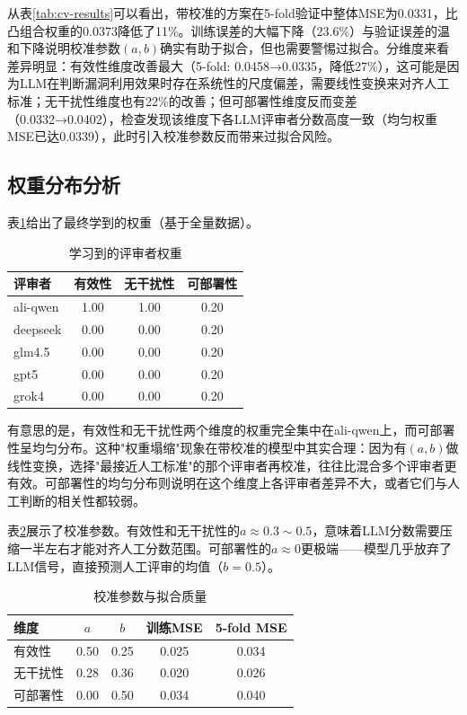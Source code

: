 从表\ref{tab:cv-results}可以看出，带校准的方案在5-fold验证中整体MSE为0.0331，比凸组合权重的0.0373降低了11\%。训练误差的大幅下降（23.6\%）与验证误差的温和下降说明校准参数$(a, b)$确实有助于拟合，但也需要警惕过拟合。分维度来看差异明显：有效性维度改善最大（5-fold: 0.0458→0.0335，降低27\%），这可能是因为LLM在判断漏洞利用效果时存在系统性的尺度偏差，需要线性变换来对齐人工标准；无干扰性维度也有22\%的改善；但可部署性维度反而变差（0.0332→0.0402），检查发现该维度下各LLM评审者分数高度一致（均匀权重MSE已达0.0339），此时引入校准参数反而带来过拟合风险。

\subsection{权重分布分析}

表\ref{tab:weight-distribution}给出了最终学到的权重（基于全量数据）。

\begin{table}[htbp]
\centering
\caption{学习到的评审者权重}
\label{tab:weight-distribution}
\begin{tabular}{lccc}
\hline
\textbf{评审者} & \textbf{有效性} & \textbf{无干扰性} & \textbf{可部署性} \\
\hline
ali-qwen  & 1.00 & 1.00 & 0.20 \\
deepseek  & 0.00 & 0.00 & 0.20 \\
glm4.5    & 0.00 & 0.00 & 0.20 \\
gpt5      & 0.00 & 0.00 & 0.20 \\
grok4     & 0.00 & 0.00 & 0.20 \\
\hline
\end{tabular}
\end{table}

有意思的是，有效性和无干扰性两个维度的权重完全集中在ali-qwen上，而可部署性呈均匀分布。这种"权重塌缩"现象在带校准的模型中其实合理：因为有$(a, b)$做线性变换，选择"最接近人工标准"的那个评审者再校准，往往比混合多个评审者更有效。可部署性的均匀分布则说明在这个维度上各评审者差异不大，或者它们与人工判断的相关性都较弱。

表\ref{tab:calibration-params}展示了校准参数。有效性和无干扰性的$a \approx 0.3\sim 0.5$，意味着LLM分数需要压缩一半左右才能对齐人工分数范围。可部署性的$a \approx 0$更极端——模型几乎放弃了LLM信号，直接预测人工评审的均值（$b = 0.5$）。

\begin{table}[htbp]
\centering
\caption{校准参数与拟合质量}
\label{tab:calibration-params}
\begin{tabular}{lcccc}
\hline
\textbf{维度} & $a$ & $b$ & \textbf{训练MSE} & \textbf{5-fold MSE} \\
\hline
有效性     & 0.50 & 0.25 & 0.025 & 0.034 \\
无干扰性   & 0.28 & 0.36 & 0.020 & 0.026 \\
可部署性   & 0.00 & 0.50 & 0.034 & 0.040 \\
\hline
\end{tabular}
\end{table}

